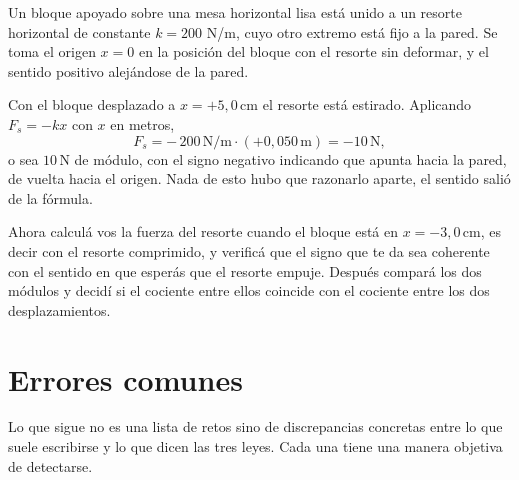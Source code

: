 \documentclass[11pt,openany]{book}
\begin{document}
\begin{ejemplo}[parcial]
Un bloque apoyado sobre una mesa horizontal lisa está unido a un resorte horizontal de constante $k = 200$ N/m, cuyo otro extremo está fijo a la pared. Se toma el origen $x = 0$ en la posición del bloque con el resorte sin deformar, y el sentido positivo alejándose de la pared.

Con el bloque desplazado a $x = +5{,}0\,\mathrm{cm}$ el resorte está estirado. Aplicando $F_s = -kx$ con $x$ en metros,
\[
F_s = -\,200\,\mathrm{N/m} \cdot (+0{,}050\,\mathrm{m}) = -10\,\mathrm{N},
\]
o sea $10\,\mathrm{N}$ de módulo, con el signo negativo indicando que apunta hacia la pared, de vuelta hacia el origen. Nada de esto hubo que razonarlo aparte, el sentido salió de la fórmula.

Ahora calculá vos la fuerza del resorte cuando el bloque está en $x = -3{,}0\,\mathrm{cm}$, es decir con el resorte comprimido, y verificá que el signo que te da sea coherente con el sentido en que esperás que el resorte empuje. Después compará los dos módulos y decidí si el cociente entre ellos coincide con el cociente entre los dos desplazamientos.
\end{ejemplo}

\section{Errores comunes}

Lo que sigue no es una lista de retos sino de discrepancias concretas entre lo que suele escribirse y lo que dicen las tres leyes. Cada una tiene una manera objetiva de detectarse.
\end{document}
